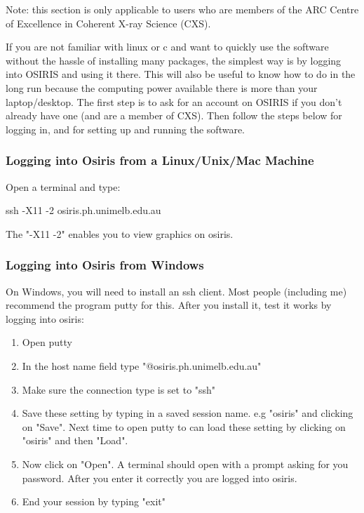\documentclass[]{cxs-software}
\begin{document}
Note: this section is only applicable to users who are members of
the ARC Centre of Excellence in Coherent X-ray Science (CXS).

If you are not familiar with linux or c and want to quickly use the
software without the hassle of installing many packages, the simplest
way is by logging into OSIRIS and using it there. This will also be
useful to know how to do in the long run because the computing power
available there is more than your laptop/desktop. The first step is to
ask for an account on OSIRIS if you don't already have one (and are a
member of CXS). Then follow the steps below for logging in, and for
setting up and running the software.

\subsubsection{Logging into Osiris from a Linux/Unix/Mac Machine}

Open a terminal and type: 
\begin{myverbatim}
  ssh -X11 -2 osiris.ph.unimelb.edu.au 
\end{myverbatim}
The "-X11 -2" enables you to view graphics on osiris.

\subsubsection{Logging into Osiris from Windows}

On Windows, you will need to install an ssh client. Most people
(including me) recommend the program putty for this.  After you
install it, test it works by logging into osiris:
\begin{enumerate}
\item Open putty 
\item In the host name field type "@osiris.ph.unimelb.edu.au" 
\item Make sure the connection type is set to "ssh" 
\item Save these setting by typing in a saved session name. e.g
  "osiris" and clicking on "Save". Next time to open putty to can load
  these setting by clicking on "osiris" and then "Load".
\item Now click on "Open". A terminal should open with a prompt asking
  for you password. After you enter it correctly you are logged into
  osiris.
\item End your session by typing "exit"
\end{enumerate}
\end{document}
